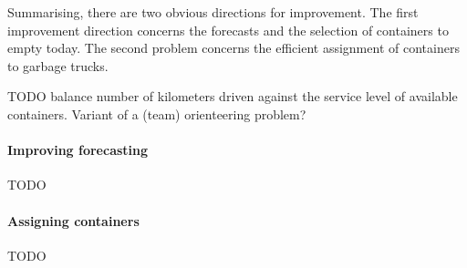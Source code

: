 \documentclass[a4paper, 12pt]{article}
\begin{document}
    Summarising, there are two obvious directions for improvement.
    The first improvement direction concerns the forecasts and the selection of containers to empty today.
    The second problem concerns the efficient assignment of containers to garbage trucks.

    TODO balance number of kilometers driven against the service level of available containers.
    Variant of a (team) orienteering problem?

    \paragraph{Improving forecasting}
    TODO

    \paragraph{Assigning containers}
    TODO

    \clearpage
    \printbibliography
\end{document}
